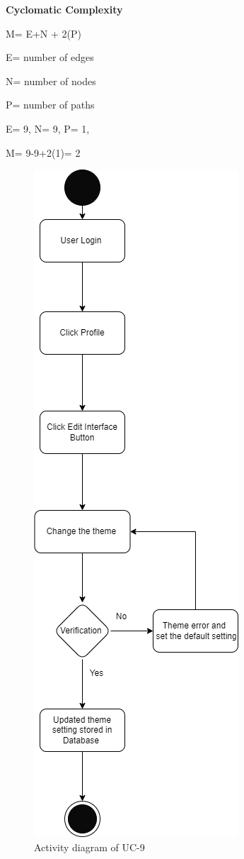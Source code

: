 \textbf{Cyclomatic Complexity}


M= E+N + 2(P)

E= number of edges

N= number of nodes

P= number of paths

E= 9,
N= 9,
P= 1,

M= 9-9+2(1)= 2

\begin{figure}[H]
    \centering
    \includegraphics[scale=0.6]{./diagrams/Activity Diagram/ad-09.png}
    \caption{Activity diagram of UC-9}
    \label{fig:act-09}

\end{figure}



